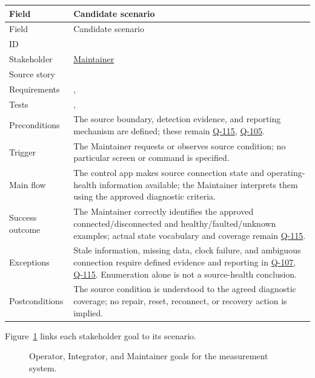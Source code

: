 \small
\begin{tabularx}{\linewidth}{L{2.8cm}Y}
\caption{Assess source connection and operating health Use Case\label{Table:UC-103}}\\
\toprule
Field & Candidate scenario\\\midrule
\endfirsthead
\toprule
Field & Candidate scenario\\\midrule
\endhead
\bottomrule
\endlastfoot
ID & \\
Stakeholder & \hyperref[Stakeholder:Maintainer]{Maintainer}\\
Source story & \\
Requirements & , \\
Tests & , \\
Preconditions & The source boundary, detection evidence, and reporting mechanism are defined; these remain \hyperref[Question:Q-115]{Q-115}, \hyperref[Question:Q-105]{Q-105}.\\
Trigger & The Maintainer requests or observes source condition; no particular screen or command is specified.\\
Main flow & The control app makes source connection state and operating-health information available; the Maintainer interprets them using the approved diagnostic criteria.\\
Success outcome & The Maintainer correctly identifies the approved connected/disconnected and healthy/faulted/unknown examples; actual state vocabulary and coverage remain \hyperref[Question:Q-115]{Q-115}.\\
Exceptions & Stale information, missing data, clock failure, and ambiguous connection require defined evidence and reporting in \hyperref[Question:Q-107]{Q-107}, \hyperref[Question:Q-115]{Q-115}. Enumeration alone is not a source-health conclusion.\\
Postconditions & The source condition is understood to the agreed diagnostic coverage; no repair, reset, reconnect, or recovery action is implied.\\
\end{tabularx}
\normalsize

Figure~\ref{Figure:UseCaseDiagram} links each stakeholder goal to its scenario.
\begin{figure}[htbp]\centering

\caption{Operator, Integrator, and Maintainer goals for the measurement system.}\label{Figure:UseCaseDiagram}
\end{figure}
